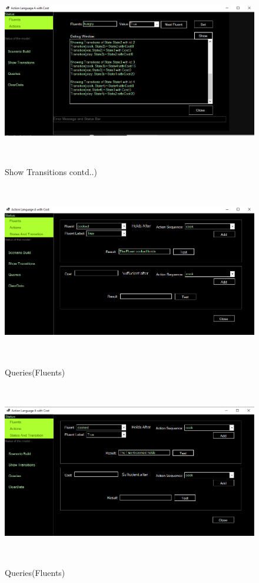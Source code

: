 \documentclass[11pt]{article}
\begin{document}
		\begin{figure}[H]
		\centering
		\includegraphics[width=6in,height=3in]{./testImages/Example3/img7.png}
		\label{Figure:f03.7}
		\caption{Show Transitions contd..)}
	\end{figure}
	\begin{figure}[H]
		\centering
		\includegraphics[width=6in,height=3in]{./testImages/Example3/img8.png}
		\label{Figure:f03.8}
		\caption{Queries(Fluents)}
	\end{figure}
	\begin{figure}[H]
		\centering
		\includegraphics[width=6in,height=3in]{./testImages/Example3/img9.png}
		\label{Figure:f03.9}
		\caption{Queries(Fluents)}
	\end{figure}
\end{document}
